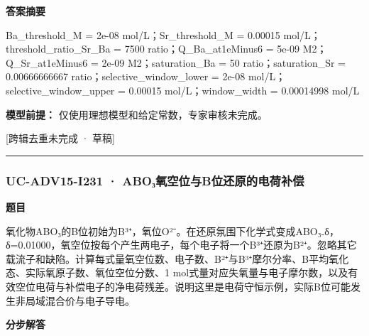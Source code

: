 \documentclass[UTF8,11pt,a4paper]{ctexart}
\begin{document}
\noindent\textbf{答案摘要}\par
Ba\_threshold\_M = 2e-08 mol/L；Sr\_threshold\_M = 0.00015 mol/L；threshold\_ratio\_Sr\_Ba = 7500 ratio；Q\_Ba\_at1eMinus6 = 5e-09 M2；Q\_Sr\_at1eMinus6 = 2e-09 M2；saturation\_Ba = 50 ratio；saturation\_Sr = 0.00666666667 ratio；selective\_window\_lower = 2e-08 mol/L；selective\_window\_upper = 0.00015 mol/L；window\_width = 0.00014998 mol/L\par
\noindent\textbf{模型前提：}
仅使用理想模型和给定常数，专家审核未完成。\par
\noindent\textcolor{red!65!black}{[跨辑去重未完成 · 草稿]} \par
\medskip\hrule\medskip
{}
\subsubsection*{UC-ADV15-I231 · ABO₃氧空位与B位还原的电荷补偿}
\noindent\textbf{题目}\par
氧化物ABO₃的B位初始为B³⁺，氧位O²⁻。在还原氛围下化学式变成ABO₃₋δ，δ=0.01000，氧空位按每个产生两电子，每个电子将一个B³⁺还原为B²⁺。忽略其它载流子和缺陷。计算每式量氧空位数、电子数、B²⁺与B³⁺摩尔分率、B平均氧化态、实际氧原子数、氧位空位分数、1 mol式量对应失氧量与电子摩尔数，以及有效空位电荷与补偿电子的净电荷残差。说明这里是电荷守恒示例，实际B位可能发生非局域混合价与电子导电。\par
\medskip\noindent\textbf{分步解答}
\end{document}
